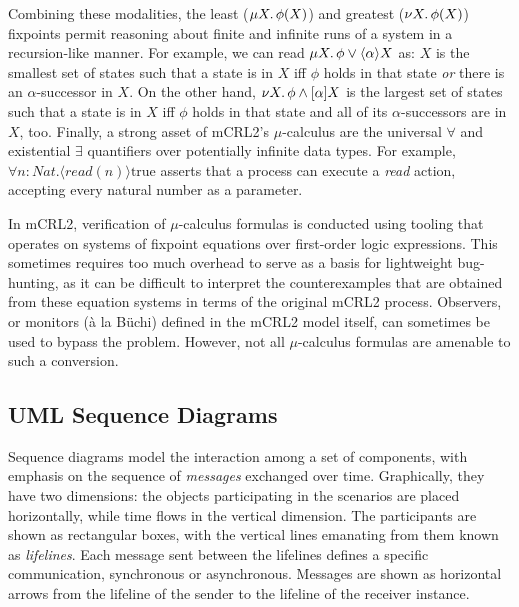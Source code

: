 \documentclass[letter]{llncs}
\begin{document}
Combining these modalities, the least ($\mu X\ldotp \phi(X)$) and
greatest ($\nu X\ldotp \phi(X)$) fixpoints permit reasoning about finite
and infinite runs of a system in a recursion-like manner.  For example,
we can read $\mu X\ldotp\phi\vee\langle\alpha\rangle X$ as: $X$ is
the smallest set of states such that a state is in $X$ iff $\phi$
holds in that state \emph{or} there is an $\alpha$-successor in $X$.
On the other hand, $\nu X\ldotp\phi \wedge[\alpha]X$ is the largest
set of states such that a state is in $X$ iff $\phi$ holds in that
state and all of its $\alpha$-successors are in $X$, too.  Finally, a
strong asset of mCRL2's $\mu$-calculus are the universal $\forall$ and
existential $\exists$ quantifiers over potentially infinite data types.
For example, $\forall n{:}Nat. \langle \textit{read}(n) \rangle \text{true}$
asserts that a process can execute a \emph{read} action, accepting every
natural number as a parameter.

In mCRL2, verification of $\mu$-calculus formulas is conducted using tooling that operates
on systems of fixpoint equations over first-order logic expressions.
This sometimes requires too much overhead to serve as a basis for lightweight 
bug-hunting, as it can be difficult to interpret the counterexamples that are obtained from
these equation systems in terms of the original mCRL2 process.
Observers, or monitors (\`{a} la B\"uchi) defined in the mCRL2 model itself, can sometimes
be used to bypass the problem.
However, not all $\mu$-calculus formulas are amenable to such a conversion.
\vspace{-10 pt}

\subsection{UML Sequence Diagrams}
\vspace{-6 pt}

Sequence diagrams model the interaction among a set of components, with
emphasis on the sequence of \emph{messages} exchanged over time. Graphically, they have
two dimensions: the objects participating in the scenarios are placed horizontally, 
while time flows in the vertical dimension. The participants are shown as rectangular boxes, with the vertical lines
emanating from them known as \emph{lifelines}. 
Each message sent between the lifelines defines a specific communication, synchronous or asynchronous.
Messages are shown as horizontal arrows from the lifeline of the sender to the lifeline of the receiver instance. 
\end{document}
